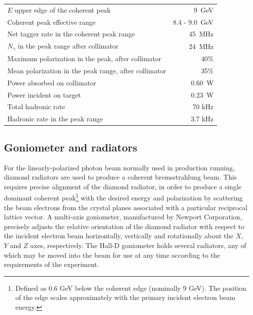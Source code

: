 \begin{table}[btp]
\begin{center}
\begin{tabular}{|l|r|}
\hline\hline
$E$ upper edge of the coherent peak & 9~GeV \\
Coherent peak effective range       & 8.4 - 9.0~GeV\\
Net tagger rate in the coherent peak range & 45~MHz  \\
$N_{\gamma}$ in the peak range after collimator & 24~MHz  \\
Maximum polarization in the peak, after collimator & 40\% \\
Mean polarization in the peak range, after collimator & 35\% \\
Power absorbed on collimator & 0.60~W \\
Power incident on target & 0.23~W \\
Total hadronic rate & 70 kHz \\
Hadronic rate in the peak range & 3.7 kHz \\
\hline\hline
\end{tabular}
\end{center}
\end{table}


\subsection{Goniometer and radiators \label{sec:radiators}}
For the linearly-polarized photon beam normally used in \GX{} production running, diamond radiators 
are used to produce a coherent bremsstrahlung beam. This requires precise alignment of the diamond
radiator, in order to produce a single dominant coherent peak\footnote{Defined as 0.6 GeV below the coherent edge (nominally 9 GeV). The position of the edge scales approximately with the primary incident electron beam energy.}  with the desired energy and polarization
by scattering the beam electrons from the crystal planes associated with a particular reciprocal lattice
vector.
A multi-axis goniometer, manufactured by Newport Corporation, precisely
adjusts the relative orientation of the
diamond radiator with respect to the incident electron beam horizontally, vertically and rotationally about the $X$, $Y$ and $Z$ axes, respectively.
The Hall-D goniometer holds several radiators, any of which may be moved into the beam for use at any time
according to the requirements of the experiment.

